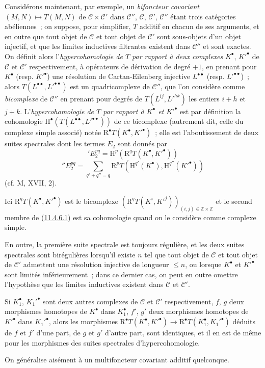 \begin{env}[11.4.6]
\label{0.11.4.6-fr}
Considérons maintenant, par exemple, un \emph{bifoncteur covariant}
$(M,N)\mapsto T(M,N)$ de $\mathcal C\times\mathcal C'$ dans $\mathcal C''$,
$\mathcal C$, $\mathcal C'$, $\mathcal C''$ étant trois catégories
abéliennes~; on suppose, pour simplifier, $T$ additif en chacun de ses
arguments, et en outre que tout objet de $\mathcal C$ et tout objet de
$\mathcal C'$ sont sous-objets d'un objet injectif, et que les limites
inductives filtrantes existent dans $\mathcal C''$ et sont exactes. On définit
alors l'\emph{hypercohomologie de $T$ par rapport à deux complexes}
$K^\bullet$, $K'^\bullet$ de $\mathcal C$ et $\mathcal C'$ respectivement, à
opérateurs de dérivation de degré $+1$, en prenant pour $K^\bullet$ (resp.
$K'^\bullet$) une résolution de Cartan-Eilenberg injective
$L^{\bullet\bullet}$ (resp. $L'^{\bullet\bullet}$)~; alors
$T(L^{\bullet\bullet},L'^{\bullet\bullet})$ est un quadricomplexe de
$\mathcal C''$, que l'on considère comme \emph{bicomplexe} de $\mathcal C''$
en prenant pour degrés de $T(L^{ij},L'^{hk})$ les entiers $i+h$ et $j+k$.
L'\emph{hypercohomologie de $T$ par rapport à $K^\bullet$ et $K'^\bullet$}
est par définition la cohomologie
$\mathrm H^\bullet(T(L^{\bullet\bullet},L'^{\bullet\bullet}))$ de ce
bicomplexe (autrement dit, celle du complexe simple associé) notée
$\mathrm R^\bullet T(K^\bullet,K'^\bullet)$~; elle est l'aboutissement de
deux suites spectrales dont les termes $E_2$ sont donnés par
\[
  \label{0.11.4.6.1-fr}
  'E_2^{pq}=\mathrm H^p(\mathrm R^qT(K^\bullet,K'^\bullet))
  \tag{11.4.6.1}
\]
\[
  \label{0.11.4.6.2-fr}
  ''E_2^{pq}=\sum_{q'+q''=q}
  \mathrm R^pT(\mathrm H^{q'}(K^\bullet),\mathrm H^{q''}(K'^\bullet))
  \tag{11.4.6.2}
\]
(cf. M, XVII, 2).

Ici $\mathrm R^qT(K^\bullet,K'^\bullet)$ est le bicomplexe
$(\mathrm R^qT(K^i,K'^j))_{(i,j)\in\mathbb Z\times\mathbb Z}$ et le second
membre de (\hyperref[0.11.4.6.1-fr]{11.4.6.1}) est sa cohomologie quand on le
considère comme complexe simple.

En outre, la première suite spectrale est toujours régulière, et les deux
suites spectrales sont birégulières lorsqu'il existe $n$ tel que tout objet de
$\mathcal C$ et tout objet de $\mathcal C'$ admettent une résolution injective
de longueur $\leq n$, ou lorsque $K^\bullet$ et $K'^\bullet$ sont limités
inférieurement~; dans ce dernier cas, on peut en outre omettre l'hypothèse que
les limites inductives existent dans $\mathcal C$ et $\mathcal C'$.

Si $K_1^\bullet$, $K_1'^\bullet$ sont deux autres complexes de $\mathcal C$ et
$\mathcal C'$ respectivement, $f$, $g$ deux morphismes homotopes de
$K^\bullet$ dans $K_1^\bullet$, $f'$, $g'$ deux morphismes homotopes de
$K'^\bullet$ dans $K_1'^\bullet$, alors les morphismes
$\mathrm R^\bullet T(K^\bullet,K'^\bullet)\to
\mathrm R^\bullet T(K_1^\bullet,K_1'^\bullet)$ déduits de $f$ et $f'$ d'une
part, de $g$ et $g'$ d'autre part, sont identiques, et il en est de même pour
les morphismes des suites spectrales d'hypercohomologie.

On généralise aisément à un multifoncteur covariant additif quelconque.
\end{env}

